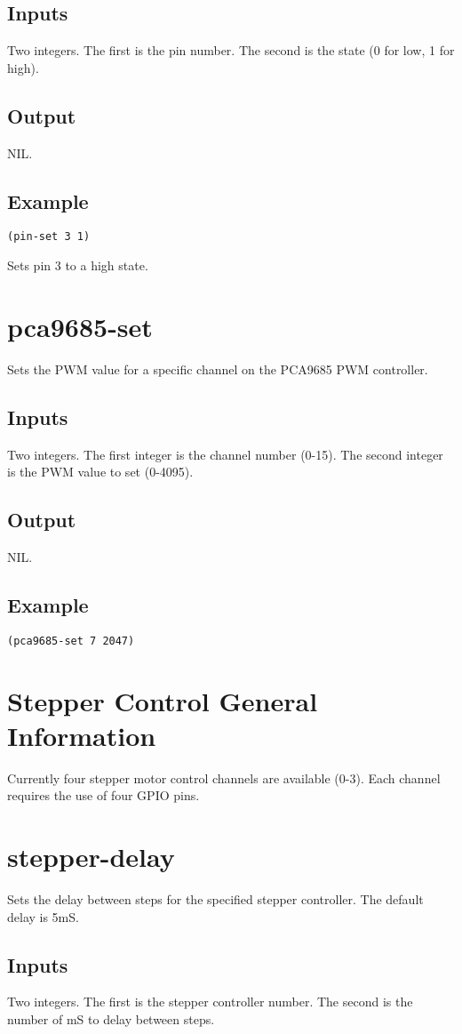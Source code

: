 \documentclass[10pt, openany]{book}
\begin{document}
\subsection{Inputs}
Two integers.  The first is the pin number.  The second is the state (0 for low, 1 for high).
\subsection{Output}
NIL.
\subsection{Example}
\begin{lstlisting}
(pin-set 3 1)
\end{lstlisting}
Sets pin 3 to a high state.

\section{pca9685-set}
Sets the PWM value for a specific channel on the PCA9685 PWM controller.
\subsection{Inputs}
Two integers.  The first integer is the channel number (0-15).  The second integer is the PWM value to set (0-4095).
\subsection{Output}
NIL.
\subsection{Example}
\begin{lstlisting}
(pca9685-set 7 2047)
\end{lstlisting}

\section{Stepper Control General Information}
Currently four stepper motor control channels are available (0-3).  Each channel requires the use of four GPIO pins.

\section{stepper-delay}
Sets the delay between steps for the specified stepper controller.  The default delay is 5mS.
\subsection{Inputs}
Two integers.  The first is the stepper controller number.  The second is the number of mS to delay between steps.
\end{document}
